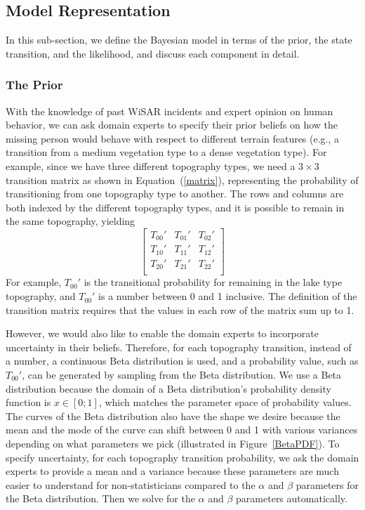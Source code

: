 \subsection{Model Representation}
\label{sec:3.4}

In this sub-section, we define the Bayesian model in terms of the prior, the state transition, and the likelihood, and discuss each component in detail.

\subsubsection{The Prior}
\label{sec:3.4.1}

With the knowledge of past WiSAR incidents and expert opinion on human behavior, we can ask domain experts to specify their prior beliefs on how the missing person would behave with respect to different terrain features (e.g., a transition from a medium vegetation type to a dense vegetation type). For example, since we have three different topography types, we need a $3 \times 3$ transition matrix as shown in Equation~(\ref{matrix}), representing the probability of transitioning from one topography type to another. The rows and columns are both indexed by the different topography types, and it is possible to remain in the same topography, yielding
\begin{equation}
\left[
\begin{array}{ccc}
T_{00}' & T_{01}' & T_{02}'\\
T_{10}' & T_{11}' & T_{12}'\\
T_{20}' & T_{21}' & T_{22}'\\
\end{array}
\right]
\label{matrix}
\end{equation}
For example, $T_{00}'$ is the transitional probability for remaining in the lake type topography, and $T_{00}'$ is a number between 0 and 1 inclusive. The definition of the transition matrix requires that the values in each row of the matrix sum up to 1.

However, we would also like to enable the domain experts to incorporate uncertainty in their beliefs. Therefore, for each topography transition, instead of a number, a continuous Beta distribution is used, and a probability value, such as $T_{00}'$, can be generated by sampling from the Beta distribution. We use a Beta distribution because the domain of a Beta distribution's probability density function is $x \in [0; 1]$, which matches the parameter space of probability values. The curves of the Beta distribution also have the shape we desire because the mean and the mode of the curve can shift between 0 and 1 with various variances depending on what parameters we pick (illustrated in Figure~\ref{BetaPDF}). To specify uncertainty, for each topography transition probability, we ask the domain experts to provide a mean and a variance because these parameters are much easier to understand for non-statisticians compared to the $\alpha$ and $\beta$ parameters for the Beta distribution. Then we solve for the $\alpha$ and $\beta$ parameters automatically.


